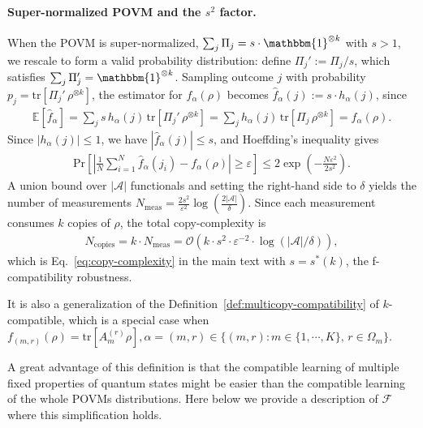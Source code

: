 \documentclass[aps,%
twocolumn,%
floatfix,%
pra,%
amsfonts,%
groupedaddress,%
superscriptaddress]{revtex4-2}%
\newcommand{\1}{\mathbbm{1}}
\newcommand*{\cA}{\mathcal{A}}
\begin{document}
\paragraph{Super-normalized POVM and the $s^2$ factor.}
When the POVM is super-normalized, $\sum_j \Pi_j = s\cdot\1^{\otimes k}$ with $s > 1$, we rescale to form a valid probability distribution: define $\Pi_j' := \Pi_j/s$, which satisfies $\sum_j \Pi_j' = \1^{\otimes k}$. Sampling outcome $j$ with probability $p_j = \mathrm{tr}[\Pi_j'\,\rho^{\otimes k}]$, the estimator for $f_\alpha(\rho)$ becomes $\hat{f}_\alpha(j) := s \cdot h_\alpha(j)$, since
\begin{align}
\mathbb{E}[\hat{f}_\alpha] = \sum_j s\, h_\alpha(j)\,\mathrm{tr}[\Pi_j'\,\rho^{\otimes k}] = \sum_j h_\alpha(j)\,\mathrm{tr}[\Pi_j\,\rho^{\otimes k}] = f_\alpha(\rho).
\end{align}
Since $|h_\alpha(j)| \leq 1$, we have $|\hat{f}_\alpha(j)| \leq s$, and Hoeffding's inequality gives
\begin{align}\label{eq:hoeffding-super}
\mathrm{Pr}\!\left[\left|\frac{1}{N}\sum_{i=1}^N \hat{f}_\alpha(j_i) - f_\alpha(\rho)\right| \geq \varepsilon\right] \leq 2\exp\!\left(-\frac{N\varepsilon^2}{2s^2}\right).
\end{align}
A union bound over $|\cA|$ functionals and setting the right-hand side to $\delta$ yields the number of measurements $N_{\mathrm{meas}} = \frac{2s^2}{\varepsilon^2}\log\!\left(\frac{2|\cA|}{\delta}\right)$.
Since each measurement consumes $k$ copies of $\rho$, the total copy-complexity is
\begin{align}\label{eq:copy-complexity-derived}
N_{\mathrm{copies}} = k \cdot N_{\mathrm{meas}} = \mathcal{O}\!\left(k\cdot s^2\cdot\varepsilon^{-2}\cdot\log(|\cA|/\delta)\right),
\end{align}
which is Eq.~\eqref{eq:copy-complexity} in the main text with $s = s^*(k)$, the f-compatibility robustness.
\color{black}

It is also a generalization of the Definition~\ref{def:multicopy-compatibility} of $k$-compatible, which is a special case when $f_{(m,r)}(\rho) = \mathrm{tr}[A_m^{(r)}\rho], \alpha = (m,r) \in \{(m,r) : m \in \{1,\cdots,K\},\, r \in \Omega_m\}$.

A great advantage of this definition is that the compatible learning of multiple fixed properties of quantum states might be easier than the compatible learning of the whole POVMs distributions. 
Here below we provide a description of $\mathcal{F}$ where this simplification holds.
\end{document}
